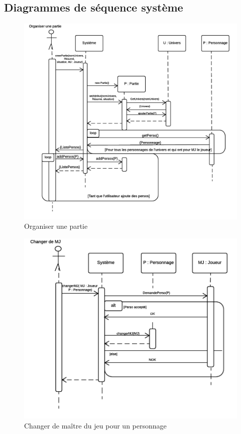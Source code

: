 \documentclass[a4paper,oneside,10pt]{article}
\begin{document}
\pagebreak
\subsection{Diagrammes de séquence système}
\begin{figure}[H]
	\begin{center}
		\includegraphics[width=12cm]{images/sequence/DS-OrganiserPartie.png}  
		\caption{Organiser une partie}
	\end{center}
\end{figure}
\begin{figure}[H]
	\begin{center}
		\includegraphics[width=12cm]{images/sequence/DS-ChangerMJ.png}  
		\caption{Changer de maître du jeu pour un personnage}
	\end{center}
\end{figure}
\end{document}
